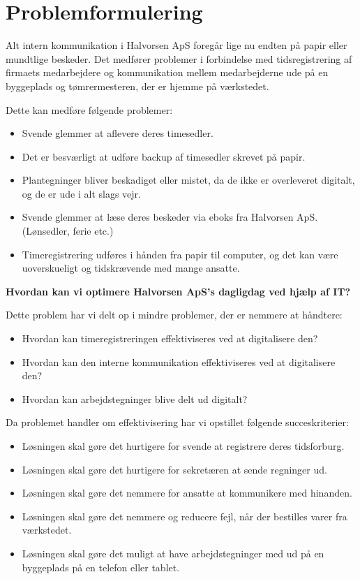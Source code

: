 \section{Problemformulering} \label{problemformulering}

Alt intern kommunikation i Halvorsen ApS foregår lige nu endten på papir eller mundtlige beskeder.
Det medfører problemer i forbindelse med tidsregistrering af firmaets medarbejdere og kommunikation mellem medarbejderne ude på en byggeplads og tømrermesteren, der er hjemme på værkstedet.

Dette kan medføre følgende problemer:
\begin{itemize}
    \item Svende glemmer at aflevere deres timesedler.
    \item Det er besværligt at udføre backup af timesedler skrevet på papir.
    \item Plantegninger bliver beskadiget eller mistet, da de ikke er overleveret digitalt, og de er ude i alt slags vejr.
    \item Svende glemmer at læse deres beskeder via eboks fra Halvorsen ApS. (Lønsedler, ferie etc.)
    \item Timeregistrering udføres i hånden fra papir til computer, og det kan være uoverskueligt og tidskrævende med mange ansatte.
\end{itemize}

\textbf{Hvordan kan vi optimere Halvorsen ApS's dagligdag ved hjælp af IT?}

Dette problem har vi delt op i mindre problemer, der er nemmere at håndtere:
\begin{itemize}
    \item Hvordan kan timeregistreringen effektiviseres ved at digitalisere den?
    \item Hvordan kan den interne kommunikation effektiviseres ved at digitalisere den?
    \item Hvordan kan arbejdstegninger blive delt ud digitalt?
\end{itemize}

Da problemet handler om effektivisering har vi opstillet følgende succeskriterier:

\begin{itemize}
    \item Løsningen skal gøre det hurtigere for svende at registrere deres tidsforburg.
    \item Løsningen skal gøre det hurtigere for sekretæren at sende regninger ud.
    \item Løsningen skal gøre det nemmere for ansatte at kommunikere med hinanden.
    \item Løsningen skal gøre det nemmere og reducere fejl, når der bestilles varer fra værkstedet.
    \item Løsningen skal gøre det muligt at have arbejdstegninger med ud på en byggeplads på en telefon eller tablet.
\end{itemize}